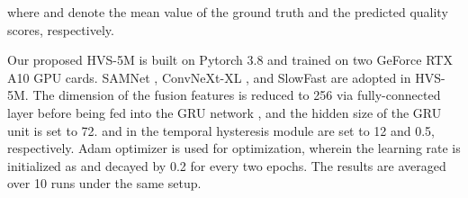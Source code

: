 \documentclass[journal]{IEEEtran}
\begin{document}
\noindent where  and  denote the mean value of the ground truth and the predicted quality scores, respectively.

Our proposed HVS-5M is built on Pytorch 3.8 and trained on two GeForce RTX A10 GPU cards. SAMNet \cite{SAMNet}, ConvNeXt-XL \cite{ConvNeXt}, and SlowFast \cite{SlowFast} are adopted in HVS-5M.
The dimension of the fusion features is reduced to 256 via fully-connected layer before being fed into the GRU network \cite{GRU}, and the hidden size of the GRU unit is set to 72.
 and  in the temporal hysteresis module are set to 12 and 0.5, respectively.
Adam optimizer \cite{Adam} is used for optimization, wherein the learning rate is initialized as  and decayed by 0.2 for every two epochs.
The results are averaged over 10 runs under the same setup.
\end{document}
